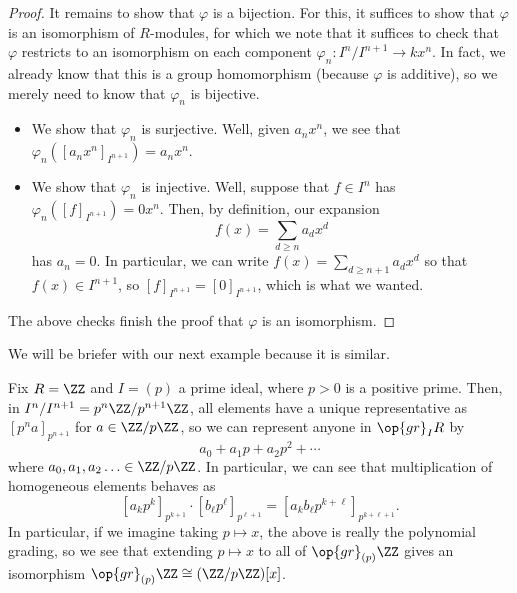 \begin{proof}
	It remains to show that $\varphi$ is a bijection. For this, it suffices to show that $\varphi$ is an isomorphism of $R$-modules, for which we note that it suffices to check that $\varphi$ restricts to an isomorphism on each component $\varphi_n:I^n/I^{n+1}\to kx^n$. In fact, we already know that this is a group homomorphism (because $\varphi$ is additive), so we merely need to know that $\varphi_n$ is bijective.
	\begin{itemize}
		\item We show that $\varphi_n$ is surjective. Well, given $a_nx^n$, we see that $\varphi_n\left(\left[a_nx^n\right]_{I^{n+1}}\right)=a_nx^n$.
		\item We show that $\varphi_n$ is injective. Well, suppose that $f\in I^n$ has $\varphi_n\left([f]_{I^{n+1}}\right)=0x^n$. Then, by definition, our expansion
		\[f(x)=\sum_{d\ge n}a_dx^d\]
		has $a_n=0$. In particular, we can write $f(x)=\sum_{d\ge n+1}a_dx^d$ so that $f(x)\in I^{n+1}$, so $[f]_{I^{n+1}}=[0]_{I^{n+1}}$, which is what we wanted.
	\end{itemize}
	The above checks finish the proof that $\varphi$ is an isomorphism.
\end{proof}
We will be briefer with our next example because it is similar.
\begin{example} %
	Fix $R=\ZZ$ and $I=(p)$ a prime ideal, where $p>0$ is a positive prime. Then, in $I^n/I^{n+1}=p^n\ZZ/p^{n+1}\ZZ$, all elements have a unique representative as $\left[p^na\right]_{p^{n+1}}$ for $a\in\ZZ/p\ZZ$, so we can represent anyone in $\op{gr}_IR$ by
	\[a_0+a_1p+a_2p^2+\cdots\]
	where $a_0,a_1,a_2\ldots\in\ZZ/p\ZZ$. In particular, we can see that multiplication of homogeneous elements behaves as
	\[\left[a_kp^k\right]_{p^{k+1}}\cdot\left[b_\ell p^\ell\right]_{p^{\ell+1}}=\left[a_kb_\ell p^{k+\ell}\right]_{p^{k+\ell+1}}.\]
	In particular, if we imagine taking $p\mapsto x$, the above is really the polynomial grading, so we see that extending $p\mapsto x$ to all of $\op{gr}_{(p)}\ZZ$ gives an isomorphism $\op{gr}_{(p)}\ZZ\cong(\ZZ/p\ZZ)[x]$.
\end{example}

